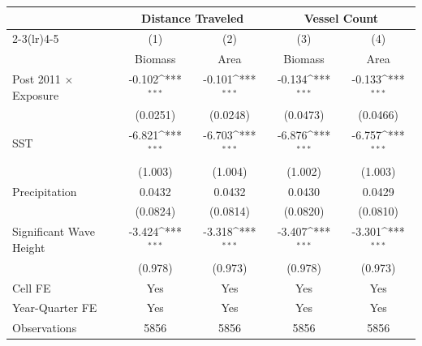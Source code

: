 {
\def\sym#1{\ifmmode^{#1}\else\(^{#1}\)\fi}
\begin{tabular}{l*{4}{c}}
\hline\hline
                    &\multicolumn{2}{c}{Distance Traveled} &\multicolumn{2}{c}{Vessel Count}           \\\cmidrule(lr){2-3}\cmidrule(lr){4-5}
                    &\multicolumn{1}{c}{(1)}&\multicolumn{1}{c}{(2)}&\multicolumn{1}{c}{(3)}&\multicolumn{1}{c}{(4)}\\
                    &\multicolumn{1}{c}{Biomass}&\multicolumn{1}{c}{Area}&\multicolumn{1}{c}{Biomass}&\multicolumn{1}{c}{Area}\\
\hline
Post 2011 $\times$ Exposure&      -0.102\sym{***}&      -0.101\sym{***}&      -0.134\sym{***}&      -0.133\sym{***}\\
                    &    (0.0251)         &    (0.0248)         &    (0.0473)         &    (0.0466)         \\
[1em]
SST                 &      -6.821\sym{***}&      -6.703\sym{***}&      -6.876\sym{***}&      -6.757\sym{***}\\
                    &     (1.003)         &     (1.004)         &     (1.002)         &     (1.003)         \\
[1em]
Precipitation       &      0.0432         &      0.0432         &      0.0430         &      0.0429         \\
                    &    (0.0824)         &    (0.0814)         &    (0.0820)         &    (0.0810)         \\
[1em]
Significant Wave Height&      -3.424\sym{***}&      -3.318\sym{***}&      -3.407\sym{***}&      -3.301\sym{***}\\
                    &     (0.978)         &     (0.973)         &     (0.978)         &     (0.973)         \\
\hline
Cell FE             &         Yes         &         Yes         &         Yes         &         Yes         \\
Year-Quarter FE     &         Yes         &         Yes         &         Yes         &         Yes         \\
Observations        &        5856         &        5856         &        5856         &        5856         \\
\hline\hline
\end{tabular}
}
